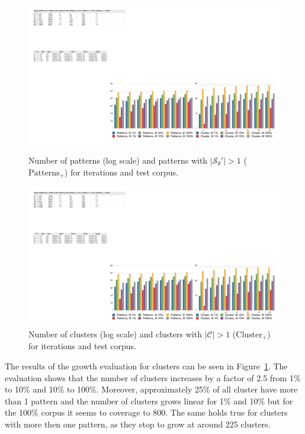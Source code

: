 \documentclass[a4paper]{llncs}
\begin{document}
\begin{figure}
\centering
\begin{minipage}{.49\textwidth}
  \centering
  \includegraphics[width=\columnwidth]{images/patterns.pdf}
  \caption{Number of patterns (log scale) and patterns with $|\mathcal{S}_\theta'| > 1$ ($\text{Patterns}_+$) for iterations and test corpus.}
	\label{fig:patterns}
\end{minipage}%
\hspace{0.02em}
\begin{minipage}{.49\textwidth}
  \centering
    \includegraphics[width=0.97\columnwidth]{images/clusters.pdf}
  \caption{Number of clusters (log scale) and clusters with $|\mathcal{C}| > 1$ ($\text{Cluster}_+$) for iterations and test corpus.}
	\label{fig:clusters}
\end{minipage}
\end{figure}

The results of the growth evaluation for clusters can be seen in Figure~\ref{fig:clusters}.
The evaluation shows that the number of clusters increases by a factor of 2.5 from 1\% to 10\% and 10\% to 100\%.
Moreover, approximately 25\% of all cluster have more than 1 pattern and the number of clusters grows linear for 1\% and 10\% but for the 100\% corpus it seems to coverage to 800.
The same holds true for clusters with more then one pattern, as they stop to grow at around 225 clusters.
\end{document}
